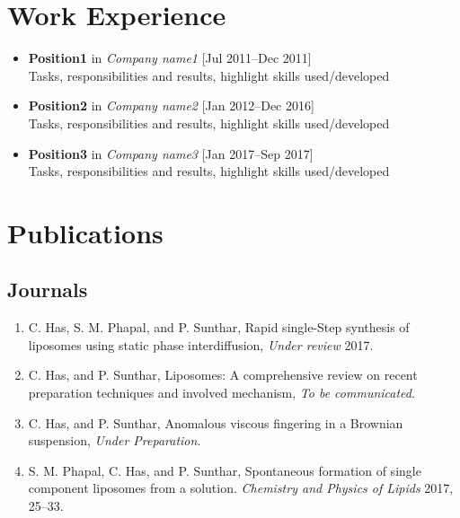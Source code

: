 \documentclass[11pt,a4paper]{moderncv}
\begin{document}
\section{Work Experience}

\begin{itemize}
	
	\item \textbf{Position1} in \textit{Company name1} \hfill [Jul 2011--Dec 2011]\\
     Tasks, responsibilities and results, highlight skills used/developed
     
	\item \textbf{Position2} in \textit{Company name2} \hfill [Jan 2012--Dec 2016]\\
	Tasks, responsibilities and results, highlight skills used/developed

	\item \textbf{Position3} in \textit{Company name3} \hfill [Jan 2017--Sep 2017]\\
	Tasks, responsibilities and results, highlight skills used/developed
	
\end{itemize}

\section{Publications}
\subsection{\textbf{Journals}}

\begin{enumerate}
	
	\item C. Has, S. M. Phapal, and P.  Sunthar, Rapid single-Step synthesis of liposomes using static phase interdiffusion, \textit{Under review} 2017.
	
	\item C. Has, and P.  Sunthar, Liposomes: A comprehensive review on recent preparation techniques and involved mechanism, \textit{To be communicated}.
	
	\item C. Has, and P.  Sunthar, Anomalous viscous fingering in a Brownian suspension, \textit{Under Preparation}.	
	
	\item S. M. Phapal, C. Has, and P.  Sunthar, Spontaneous formation of single component liposomes from a solution. \textit{Chemistry and Physics of Lipids} 2017, 25--33.

\end{enumerate}
\end{document}
